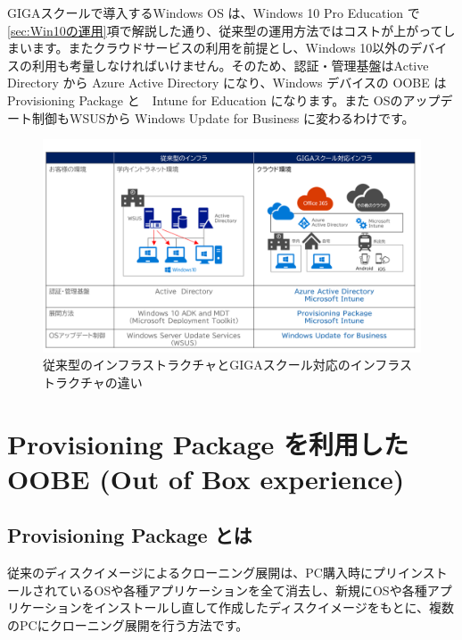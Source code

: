 GIGAスクールで導入するWindows OS は、Windows 10 Pro Education で\ref{sec:Win10の運用}項で解説した通り、従来型の運用方法ではコストが上がってしまいます。またクラウドサービスの利用を前提とし、Windows 10以外のデバイスの利用も考量しなければいけません。そのため、認証・管理基盤はActive Directory から Azure Active Directory になり、Windows デバイスの OOBE は Provisioning Package と　Intune for Education になります。また OSのアップデート制御もWSUSから Windows Update for Business に変わるわけです。

\begin{figure}
    \centering
    \includegraphics[width=16cm]{figures/Infrastructure.png}
    \caption{従来型のインフラストラクチャとGIGAスクール対応のインフラストラクチャの違い}
    \label{fig:Infra}
\end{figure}

\section{Provisioning Package を利用したOOBE (Out of Box experience)}
\label{sec:ProvisioningPackage}

\subsection{Provisioning Package とは}
\label{ProvisioningPackageとは}

従来のディスクイメージによるクローニング展開は、PC購入時にプリインストールされているOSや各種アプリケーションを全て消去し、新規にOSや各種アプリケーションをインストールし直して作成したディスクイメージをもとに、複数のPCにクローニング展開を行う方法です。

